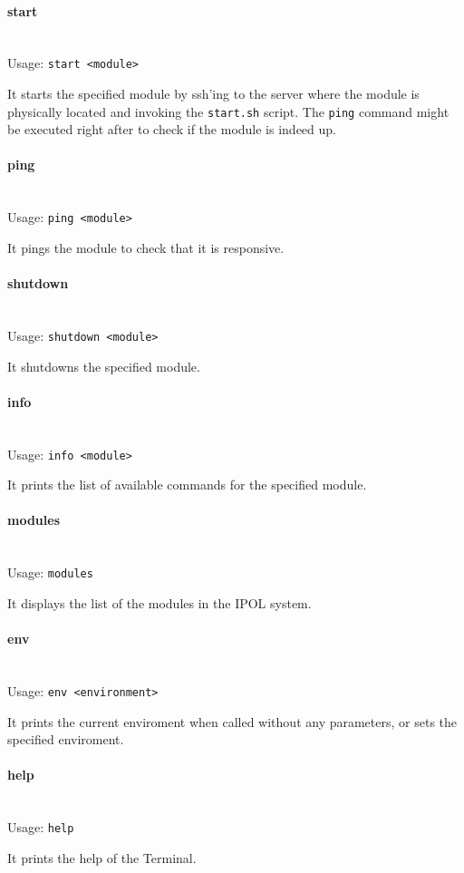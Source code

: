 \paragraph{start} \hspace{0pt} \\
Usage: {\tt start <module>}

It starts the specified module by ssh'ing to the server where the module is physically located and invoking the {\tt start.sh} script.
The {\tt ping} command might be executed right after to check if the module is indeed up.

\paragraph{ping} \hspace{0pt} \\
Usage: {\tt ping <module>}

It pings the module to check that it is responsive.

\paragraph{shutdown} \hspace{0pt} \\
Usage: {\tt shutdown <module>}

It shutdowns the specified module.

\paragraph{info} \hspace{0pt} \\
Usage: {\tt info <module>}

It prints the list of available commands for the specified module.

\paragraph{modules} \hspace{0pt} \\
Usage: {\tt modules}

It displays the list of the modules in the IPOL system.

\paragraph{env} \hspace{0pt} \\
Usage: {\tt env <environment>}

It prints the current enviroment when called without any parameters, or sets the specified enviroment.

\paragraph{help} \hspace{0pt} \\
Usage: {\tt help}

It prints the help of the Terminal.
